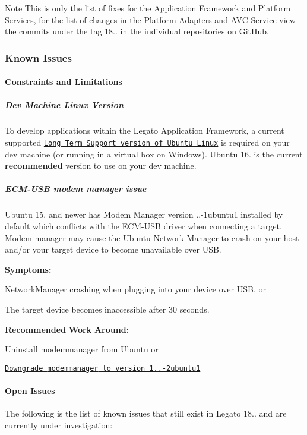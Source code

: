 \begin{DoxyNote}{Note}
This is only the list of fixes for the Application Framework and Platform Services, for the list of changes in the Platform Adapters and A\+VC Service view the commits under the tag 18.. in the individual repositories on Git\+Hub.
\end{DoxyNote}
\hypertarget{releaseNotes18010_rn1801_KnownIssues}{}\subsubsection{Known Issues}\label{releaseNotes18010_rn1801_KnownIssues}
\hypertarget{releaseNotes18010_rn1801_Constraints}{}\paragraph{Constraints and Limitations}\label{releaseNotes18010_rn1801_Constraints}
\hypertarget{releaseNotes18010_rn1801_ContraintsLinuxSupport}{}\subparagraph{Dev Machine Linux Version}\label{releaseNotes18010_rn1801_ContraintsLinuxSupport}
To develop applications within the Legato Application Framework, a current supported \href{https://www.ubuntu.com/info/release-end-of-life}{\tt Long Term Support version of Ubuntu Linux} is required on your dev machine (or running in a virtual box on Windows). Ubuntu 16. is the current {\bfseries recommended} version to use on your dev machine.\hypertarget{releaseNotes18010_rn1801_ConstECMUSB}{}\subparagraph{E\+C\+M-\/\+U\+S\+B modem manager issue}\label{releaseNotes18010_rn1801_ConstECMUSB}
Ubuntu 15. and newer has Modem Manager version {..-\/1ubuntu1} installed by default which conflicts with the E\+C\+M-\/\+U\+SB driver when connecting a target. Modem manager may cause the Ubuntu Network Manager to crash on your host and/or your target device to become unavailable over U\+SB.

{\bfseries Symptoms\+:} 
\begin{DoxyItemize}
\item Network\+Manager crashing when plugging into your device over U\+SB, or
\item The target device becomes inaccessible after 30 seconds.
\end{DoxyItemize}

{\bfseries Recommended} {\bfseries Work} {\bfseries Around\+:} 
\begin{DoxyItemize}
\item Uninstall {\ttfamily modemmanager} from Ubuntu or
\item \href{http://packages.ubuntu.com/trusty/modemmanager}{\tt Downgrade {\ttfamily modemmanager} to version 1..-\/2ubuntu1}
\end{DoxyItemize}\hypertarget{releaseNotes18010_rn1801_OpenIssues}{}\paragraph{Open Issues}\label{releaseNotes18010_rn1801_OpenIssues}
The following is the list of known issues that still exist in Legato 18.. and are currently under investigation\+:


